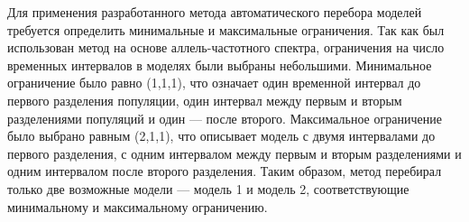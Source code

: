 Для применения разработанного метода автоматического перебора моделей требуется определить минимальные и максимальные ограничения.
Так как был использован метод на основе аллель-частотного спектра, ограничения на число временных интервалов в моделях были выбраны небольшими.
Минимальное ограничение было равно (1,1,1), что означает один временной интервал до первого разделения популяции, один интервал между первым и вторым разделениями популяций и один --- после второго.
Максимальное ограничение было выбрано равным (2,1,1), что описывает модель с двумя интервалами до первого разделения, с одним интервалом между первым и вторым разделениями и одним интервалом после второго разделения.
Таким образом, метод перебирал только две возможные модели --- модель 1 и модель 2, соответствующие минимальному и максимальному ограничению.

